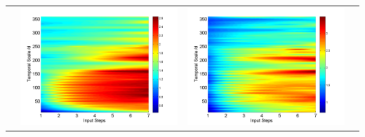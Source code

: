 \documentclass[review]{elsarticle}
\begin{document}
\begin{table}[H]
\begin{tabular}{cccc}
&\begin{minipage}{.3\textwidth}\includegraphics[width=\linewidth]{resultgraph/11532500p.png}\end{minipage}
&\begin{minipage}{.3\textwidth}\includegraphics[width=\linewidth]{resultgraph/11532500pep.png}\end{minipage}

\end{tabular}
\end{table}
\end{document}

